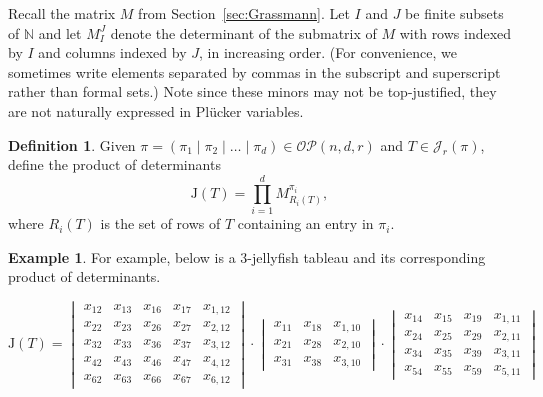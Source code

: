 \documentclass[10pt]{amsart}
\theoremstyle{definition}
\newtheorem{definition}[cdrthm]{Definition}
\theoremstyle{plain}
\theoremstyle{plain}
\theoremstyle{definition}
\newtheorem{example}[cdrthm]{Example}
\theoremstyle{remark}
\theoremstyle{plain}
\theoremstyle{plain}
\theoremstyle{plain}
\numberwithin{equation}{section}
\newcommand{\rstab}{\mathcal{J}}
\newcommand{\rspoly}{\mathrm{J}}
\newcommand{\ordsetpart}{\mathcal{OP}}
\begin{document}
Recall the matrix $M$ from Section~\ref{sec:Grassmann}. Let $I$ and $J$ be finite subsets of $\mathbb{N}$ and let $M_I^J$ denote the determinant of the submatrix of $M$ with rows indexed by $I$ and columns indexed by $J$, in increasing order. (For convenience, we sometimes write elements separated by commas in the subscript and superscript rather than formal sets.) Note since these minors may not be top-justified, they are not naturally expressed in Pl\"ucker variables.

\begin{definition}
\label{def:rsdet}
Given $\pi=(\pi_1\mid \pi_2\mid\ldots\mid \pi_d)\in\ordsetpart(n,d,r)$ and $T\in \rstab_r(\pi)$, define the product of determinants \[\rspoly(T)= 
\displaystyle\prod_{i=1}^d M_{R_i(T)}^{\pi_i},\] where $R_i(T)$ is the set of rows of $T$ containing an entry in $\pi_i$.
\end{definition}

\begin{example}\label{ex:3-jellyfish}
For example, below is a $3$-jellyfish tableau and its corresponding product of determinants. 
\begin{center}
\hspace{.5in}
$\rspoly(T)=\begin{vmatrix}
x_{12} & x_{13} & x_{16} & x_{17} & x_{1,12}\\
x_{22} & x_{23} & x_{26} & x_{27} & x_{2,12}\\
x_{32} & x_{33} & x_{36} & x_{37} & x_{3,12}\\
x_{42} & x_{43} & x_{46} & x_{47} & x_{4,12}\\
x_{62} & x_{63} & x_{66} & x_{67} & x_{6,12}
\end{vmatrix}\cdot
\begin{vmatrix}
x_{11} & x_{18} & x_{1,10}\\
x_{21} & x_{28} & x_{2,10}\\
x_{31} & x_{38} & x_{3,10} 
\end{vmatrix}\cdot
\begin{vmatrix}
x_{14} & x_{15} & x_{19} & x_{1,11} \\
x_{24} & x_{25} & x_{29} & x_{2,11} \\
x_{34} & x_{35} & x_{39} & x_{3,11} \\
x_{54} & x_{55} & x_{59} & x_{5,11} 

\end{vmatrix}
$

\end{center}
\end{example}
\end{document}
